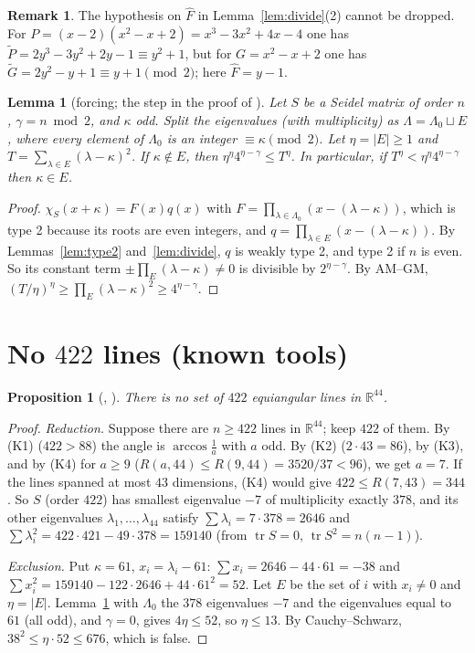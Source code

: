 \documentclass[11pt]{article}
\newtheorem{lemma}[theorem]{Lemma}
\newtheorem{proposition}[theorem]{Proposition}
\theoremstyle{definition}
\newtheorem{remark}[theorem]{Remark}
\newcommand{\R}{\mathbb{R}}
\newcommand{\tr}{\operatorname{tr}}
\begin{document}
\begin{remark}
The hypothesis on $\widehat F$ in Lemma~\ref{lem:divide}(2) cannot be dropped. For
$P=(x-2)(x^2-x+2)=x^3-3x^2+4x-4$ one has $\widetilde P=2y^3-3y^2+2y-1\equiv y^2+1$, but for
$G=x^2-x+2$ one has $\widetilde G=2y^2-y+1\equiv y+1\pmod2$; here $\widehat F=y-1$.
\end{remark}

\begin{lemma}[forcing; the step in the proof of {\cite[Lemma~3.1]{GSY21}}]\label{lem:force}
Let $S$ be a Seidel matrix of order $n$, $\gamma=n\bmod2$, and $\kappa$ odd. Split the eigenvalues
(with multiplicity) as $\Lambda=\Lambda_0\sqcup E$, where every element of $\Lambda_0$ is an integer
$\equiv\kappa\pmod 2$. Let $\eta=|E|\ge1$ and $T=\sum_{\lambda\in E}(\lambda-\kappa)^2$. If
$\kappa\notin E$, then $\eta^\eta4^{\eta-\gamma}\le T^\eta$. In particular, if
$T^\eta<\eta^\eta4^{\eta-\gamma}$ then $\kappa\in E$.
\end{lemma}
\begin{proof}
$\chi_S(x+\kappa)=F(x)q(x)$ with $F=\prod_{\lambda\in\Lambda_0}(x-(\lambda-\kappa))$, which is type 2
because its roots are even integers, and $q=\prod_{\lambda\in E}(x-(\lambda-\kappa))$. By
Lemmas~\ref{lem:type2} and~\ref{lem:divide}, $q$ is weakly type 2, and type 2 if $n$ is even. So its
constant term $\pm\prod_E(\lambda-\kappa)\ne0$ is divisible by $2^{\eta-\gamma}$. By AM--GM,
$(T/\eta)^\eta\ge\prod_E(\lambda-\kappa)^2\ge4^{\eta-\gamma}$.
\end{proof}

\section{\texorpdfstring{No $422$ lines (known tools)}{No 422 lines (known tools)}}\label{sec:422}

\begin{proposition}[{\cite[Thm.~5.21, Cor.~3.6]{GKMS16}, \cite[Lemma~3.1]{GSY21}}]\label{prop:422}
There is no set of $422$ equiangular lines in $\R^{44}$.
\end{proposition}
\begin{proof}
\emph{Reduction.} Suppose there are $n\ge422$ lines in $\R^{44}$; keep $422$ of them. By (K1)
($422>88$) the angle is $\arccos\frac1a$ with $a$ odd. By (K2) ($2\cdot43=86$), by (K3), and by (K4)
for $a\ge9$ ($R(a,44)\le R(9,44)=3520/37<96$), we get $a=7$. If the lines spanned at most $43$
dimensions, (K4) would give $422\le R(7,43)=344$. So $S$ (order $422$) has smallest eigenvalue $-7$ of
multiplicity exactly $378$, and its other eigenvalues $\lambda_1,\dots,\lambda_{44}$ satisfy
$\sum\lambda_i=7\cdot378=2646$ and $\sum\lambda_i^2=422\cdot421-49\cdot378=159140$ (from $\tr S=0$,
$\tr S^2=n(n-1)$).

\emph{Exclusion.} Put $\kappa=61$, $x_i=\lambda_i-61$: $\sum x_i=2646-44\cdot61=-38$ and
$\sum x_i^2=159140-122\cdot2646+44\cdot61^2=52$. Let $E$ be the set of $i$ with $x_i\ne0$ and $\eta=|E|$.
Lemma~\ref{lem:force} with $\Lambda_0$ the $378$ eigenvalues $-7$ and the eigenvalues equal to $61$
(all odd), and $\gamma=0$, gives $4\eta\le52$, so $\eta\le13$. By Cauchy--Schwarz,
$38^2\le\eta\cdot52\le676$, which is false.
\end{proof}
\end{document}

